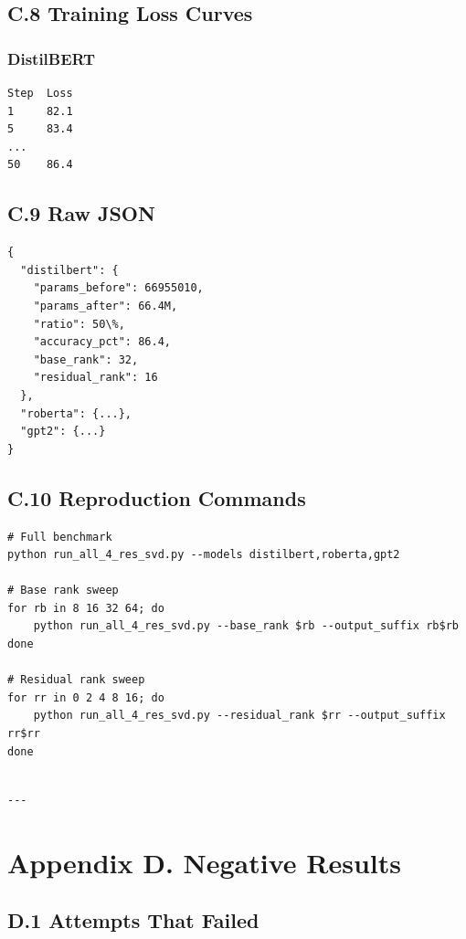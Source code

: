 \subsection{C.8 Training Loss Curves}

\subsubsection{DistilBERT}
\begin{lstlisting}
Step  Loss
1     82.1
5     83.4
...
50    86.4
\end{lstlisting}

\subsection{C.9 Raw JSON}

\begin{lstlisting}
{
  "distilbert": {
    "params_before": 66955010,
    "params_after": 66.4M,
    "ratio": 50\%,
    "accuracy_pct": 86.4,
    "base_rank": 32,
    "residual_rank": 16
  },
  "roberta": {...},
  "gpt2": {...}
}
\end{lstlisting}

\subsection{C.10 Reproduction Commands}

\begin{lstlisting}
# Full benchmark
python run_all_4_res_svd.py --models distilbert,roberta,gpt2

# Base rank sweep
for rb in 8 16 32 64; do
    python run_all_4_res_svd.py --base_rank $rb --output_suffix rb$rb
done

# Residual rank sweep
for rr in 0 2 4 8 16; do
    python run_all_4_res_svd.py --residual_rank $rr --output_suffix rr$rr
done
\end{lstlisting}
\begin{lstlisting}

---
\end{lstlisting}

\section{Appendix D. Negative Results}

\subsection{D.1 Attempts That Failed}

